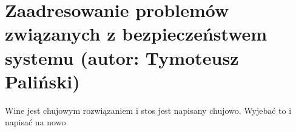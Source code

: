 
\section{Zaadresowanie problemów związanych z bezpieczeństwem systemu (autor: Tymoteusz Paliński)}
Wine jest chujowym rozwiązaniem i stos jest napisany chujowo. Wyjebać to i napisać na nowo
